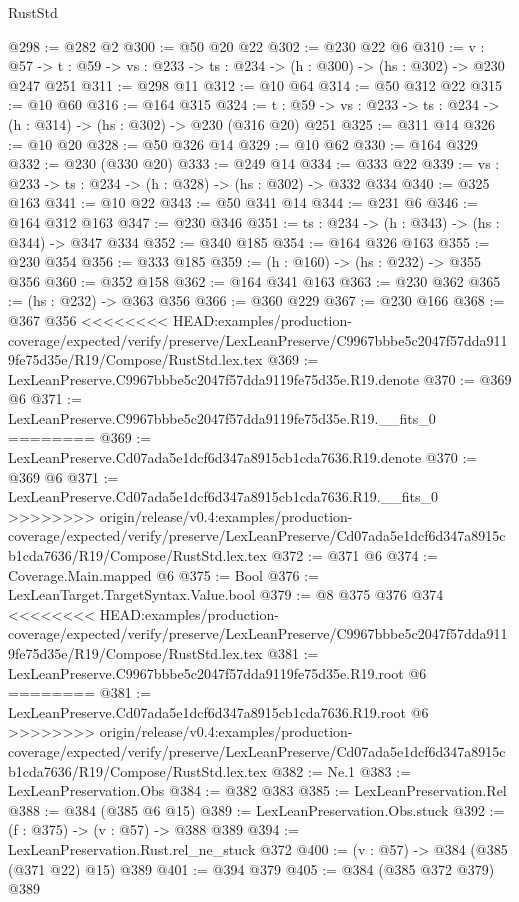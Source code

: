 \begin{lexlean}{RustStd}
\begin{coremodule}
{\begin{coremodule}
@298 := @282 @2
@300 := @50 @20 @22
@302 := @230 @22 @6
@310 := {v : @57} ->
  {t : @59} -> {vs : @233} -> {ts : @234} -> (h : @300) -> (hs : @302) -> @230 @247 @251
@311 := @298 @11
@312 := @10 @64
@314 := @50 @312 @22
@315 := @10 @60
@316 := @164 @315
@324 := {t : @59} -> {vs : @233} -> {ts : @234} -> (h : @314) -> (hs : @302) -> @230 (@316 @20) @251
@325 := @311 @14
@326 := @10 @20
@328 := @50 @326 @14
@329 := @10 @62
@330 := @164 @329
@332 := @230 (@330 @20)
@333 := @249 @14
@334 := @333 @22
@339 := {vs : @233} -> {ts : @234} -> (h : @328) -> (hs : @302) -> @332 @334
@340 := @325 @163
@341 := @10 @22
@343 := @50 @341 @14
@344 := @231 @6
@346 := @164 @312 @163
@347 := @230 @346
@351 := {ts : @234} -> (h : @343) -> (hs : @344) -> @347 @334
@352 := @340 @185
@354 := @164 @326 @163
@355 := @230 @354
@356 := @333 @185
@359 := (h : @160) -> (hs : @232) -> @355 @356
@360 := @352 @158
@362 := @164 @341 @163
@363 := @230 @362
@365 := (hs : @232) -> @363 @356
@366 := @360 @229
@367 := @230 @166
@368 := @367 @356
<<<<<<<< HEAD:examples/production-coverage/expected/verify/preserve/LexLeanPreserve/C9967bbbe5c2047f57dda9119fe75d35e/R19/Compose/RustStd.lex.tex
@369 := LexLeanPreserve.C9967bbbe5c2047f57dda9119fe75d35e.R19.denote
@370 := @369 @6
@371 := LexLeanPreserve.C9967bbbe5c2047f57dda9119fe75d35e.R19.__fits_0
========
@369 := LexLeanPreserve.Cd07ada5e1dcf6d347a8915cb1cda7636.R19.denote
@370 := @369 @6
@371 := LexLeanPreserve.Cd07ada5e1dcf6d347a8915cb1cda7636.R19.__fits_0
>>>>>>>> origin/release/v0.4:examples/production-coverage/expected/verify/preserve/LexLeanPreserve/Cd07ada5e1dcf6d347a8915cb1cda7636/R19/Compose/RustStd.lex.tex
@372 := @371 @6
@374 := Coverage.Main.mapped @6
@375 := Bool
@376 := LexLeanTarget.TargetSyntax.Value.bool
@379 := @8 @375 @376 @374
<<<<<<<< HEAD:examples/production-coverage/expected/verify/preserve/LexLeanPreserve/C9967bbbe5c2047f57dda9119fe75d35e/R19/Compose/RustStd.lex.tex
@381 := LexLeanPreserve.C9967bbbe5c2047f57dda9119fe75d35e.R19.root @6
========
@381 := LexLeanPreserve.Cd07ada5e1dcf6d347a8915cb1cda7636.R19.root @6
>>>>>>>> origin/release/v0.4:examples/production-coverage/expected/verify/preserve/LexLeanPreserve/Cd07ada5e1dcf6d347a8915cb1cda7636/R19/Compose/RustStd.lex.tex
@382 := Ne.{1}
@383 := LexLeanPreservation.Obs
@384 := @382 @383
@385 := LexLeanPreservation.Rel
@388 := @384 (@385 @6 @15)
@389 := LexLeanPreservation.Obs.stuck
@392 := (f : @375) -> (v : @57) -> @388 @389
@394 := LexLeanPreservation.Rust.rel_ne_stuck @372
@400 := (v : @57) -> @384 (@385 (@371 @22) @15) @389
@401 := @394 @379
@405 := @384 (@385 @372 @379) @389

\end{coremodule}}
\end{coremodule}
\end{lexlean}
